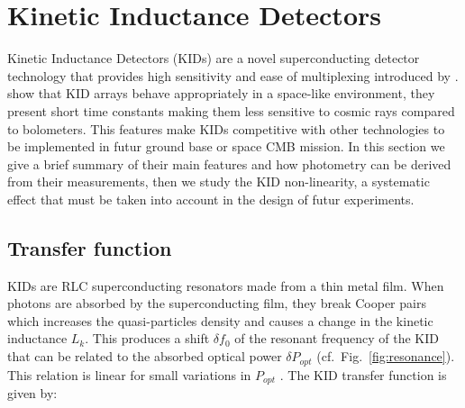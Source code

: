 
\section{Kinetic Inductance Detectors}
\label{se:kids}


%


Kinetic Inductance Detectors (KIDs) are a novel superconducting detector technology
that provides high sensitivity and ease of multiplexing introduced by \citep{2003Natur.425..817D}. \citep{2016A&A...592A..26C} show that KID arrays behave appropriately in a space-like environment, they present short time constants making them less sensitive to cosmic rays compared to bolometers. This features make KIDs competitive with other technologies to be implemented in futur ground base or space CMB mission.
In this section we give a brief summary of their main features and how photometry can be derived from their measurements, then we study the KID non-linearity, a systematic effect that must be taken into account in the design of futur experiments.

\subsection{Transfer function}

KIDs are RLC superconducting resonators made from a thin metal film. When
photons are absorbed by the superconducting film, they break Cooper pairs which
increases the quasi-particles density and causes a change in the kinetic
inductance $L_{k}$. This produces a shift $\delta f_{0}$ of the resonant
frequency of the KID \citep{2013A&A...551L..12C} that can be related to the
absorbed optical power $\delta P_{opt}$ (cf.~Fig.~\ref{fig:resonance}). This
relation is linear for small variations in $P_{opt}$
\citep{2010ApPhL..96z3511S}. The KID transfer function is given by:

